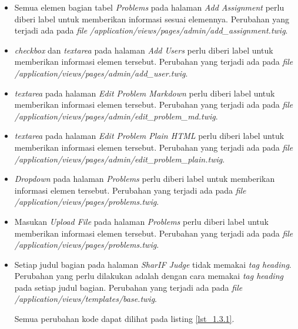 \begin{itemize}
	\item Semua elemen bagian tabel \textit{Problems} pada halaman \textit{Add Assignment} perlu diberi label untuk memberikan informasi sesuai elemennya. Perubahan yang terjadi ada pada \textit{file} \textit{/application/views/pages/admin/add\_assignment.twig}.

	\item \textit{checkbox} dan \textit{textarea} pada halaman \textit{Add Users} perlu diberi label untuk memberikan informasi elemen tersebut. Perubahan yang terjadi ada pada \textit{file} \textit{/application/views/pages/admin/add\_user.twig}.

	\item \textit{textarea} pada halaman \textit{Edit Problem Markdown} perlu diberi label untuk memberikan informasi elemen tersebut. Perubahan yang terjadi ada pada \textit{file} \textit{/application/views/pages/admin/edit\_problem\_md.twig}.

	\item \textit{textarea} pada halaman \textit{Edit Problem Plain HTML} perlu diberi label untuk memberikan informasi elemen tersebut. Perubahan yang terjadi ada pada \textit{file} \textit{/application/views/pages/admin/edit\_problem\_plain.twig}.
	
	\item \textit{Dropdown} pada halaman \textit{Problems} perlu diberi label untuk memberikan informasi elemen tersebut. Perubahan yang terjadi ada pada \textit{file} \textit{/application/views/pages/problems.twig}.

	\item Masukan \textit{Upload File} pada halaman \textit{Problems} perlu diberi label untuk memberikan informasi elemen tersebut. Perubahan yang terjadi ada pada \textit{file} \textit{/application/views/pages/problems.twig}.
	
	\item Setiap judul bagian pada halaman \textit{SharIF Judge} tidak memakai \textit{tag heading}. Perubahan yang perlu dilakukan adalah dengan cara memakai \textit{tag heading} pada setiap judul bagian.
	Perubahan yang terjadi ada pada \textit{file} \textit{/application/views/templates/base.twig}.
	
	Semua perubahan kode dapat dilihat pada listing \ref{lst_1.3.1}.
	

\end{itemize}
